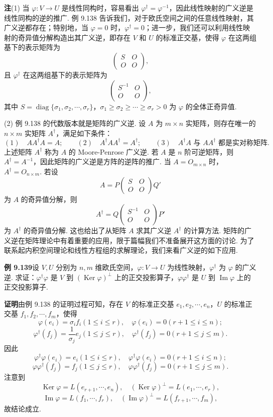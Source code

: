 \documentclass[UTF8,12pt,a4paper,fontset=fandol]{ctexart}
\begin{document}
\noindent\textbf{注}\quad (1) 当 $\varphi:V\to U$ 是线性同构时，容易看出 $\varphi^\dagger=\varphi^{-1}$，因此线性映射的广义逆是线性同构的逆的推广. 例 9.138 告诉我们，对于欧氏空间之间的任意线性映射，其广义逆都存在；特别地，当 $\varphi=0$ 时，$\varphi^\dagger=0$；进一步，我们还可以利用线性映射的奇异值分解构造出其广义逆，即存在 $V$ 和 $U$ 的标准正交基，使得 $\varphi$ 在这两组基下的表示矩阵为
\[
\begin{pmatrix}
S&O\\
O&O
\end{pmatrix},
\]
且 $\varphi^\dagger$ 在这两组基下的表示矩阵为
\[
\begin{pmatrix}
S^{-1}&O\\
O&O
\end{pmatrix},
\]
其中 $S=\operatorname{diag}\{\sigma_1,\sigma_2,\cdots,\sigma_r\}$，$\sigma_1\ge\sigma_2\ge\cdots\ge\sigma_r>0$ 为 $\varphi$ 的全体正奇异值.

(2) 例 9.138 的代数版本就是矩阵的广义逆. 设 $A$ 为 $m\times n$ 实矩阵，则存在唯一的 $n\times m$ 实矩阵 $A^\dagger$，满足如下条件：
\[
(1)\quad AA^\dagger A=A;\qquad
(2)\quad A^\dagger AA^\dagger=A^\dagger;\qquad
(3)\quad A^\dagger A\text{ 与 }AA^\dagger\text{ 都是实对称矩阵.}
\]
上述矩阵 $A^\dagger$ 称为 $A$ 的 Moore-Penrose 广义逆. 若 $A$ 是 $n$ 阶可逆矩阵，则 $A^\dagger=A^{-1}$，因此矩阵的广义逆是方阵的逆阵的推广. 当 $A=O_{m\times n}$ 时，$A^\dagger=O_{n\times m}$. 若设
\[
A=P\begin{pmatrix}
S&O\\
O&O
\end{pmatrix}Q'
\]
为 $A$ 的奇异值分解，则
\[
A^\dagger=Q\begin{pmatrix}
S^{-1}&O\\
O&O
\end{pmatrix}P'
\]
为 $A^\dagger$ 的奇异值分解. 这也给出了从矩阵 $A$ 求其广义逆 $A^\dagger$ 的计算方法. 矩阵的广义逆在矩阵理论中有着重要的应用，限于篇幅我们不准备展开这方面的讨论. 为了联系起内积空间理论和线性方程组的求解理论，我们来看广义逆的如下应用.

\noindent\textbf{例 9.139}\quad 设 $V,U$ 分别为 $n,m$ 维欧氏空间，$\varphi:V\to U$ 为线性映射，$\varphi^\dagger$ 为 $\varphi$ 的广义逆. 求证：$\varphi^\dagger\varphi$ 是 $V$ 到 $(\operatorname{Ker}\varphi)^\perp$ 上的正交投影算子，$\varphi\varphi^\dagger$ 是 $U$ 到 $\operatorname{Im}\varphi$ 上的正交投影算子.

\noindent\textbf{证明}\quad 由例 9.138 的证明过程可知，存在 $V$ 的标准正交基 $e_1,e_2,\cdots,e_n$，$U$ 的标准正交基 $f_1,f_2,\cdots,f_m$，使得
\[
\varphi(e_i)=\sigma_if_i(1\le i\le r),\quad \varphi(e_i)=0(r+1\le i\le n);
\]
\[
\varphi^\dagger(f_j)=\frac{1}{\sigma_j}e_j(1\le j\le r),\quad \varphi^\dagger(f_j)=0(r+1\le j\le m).
\]
因此
\[
\varphi^\dagger\varphi(e_i)=e_i(1\le i\le r),\quad \varphi^\dagger\varphi(e_i)=0(r+1\le i\le n);
\]
\[
\varphi\varphi^\dagger(f_j)=f_j(1\le j\le r),\quad \varphi\varphi^\dagger(f_j)=0(r+1\le j\le m).
\]
注意到
\[
\operatorname{Ker}\varphi=L(e_{r+1},\cdots,e_n),\quad
(\operatorname{Ker}\varphi)^\perp=L(e_1,\cdots,e_r),
\]
\[
\operatorname{Im}\varphi=L(f_1,\cdots,f_r),\quad
(\operatorname{Im}\varphi)^\perp=L(f_{r+1},\cdots,f_m),
\]
故结论成立.
\end{document}

